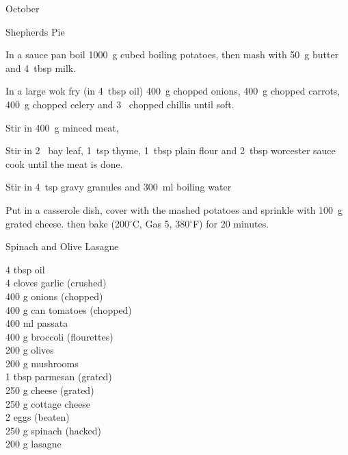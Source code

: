 \begin{menu}{October}
\begin{recipe}{2}{Shepherds Pie}
    \begin{instructions}
    \item 
        In a sauce pan boil
        1000~g cubed boiling potatoes,
        then mash with
        50~g  butter
        and
        4~tbsp  milk.
      \item 
        In a large wok fry
        (in 4~tbsp  oil)
        400~g chopped onions,
        400~g chopped carrots,
        400~g chopped celery
        and
        3~ chopped chillis
        until soft.
      \item 
        Stir in 
        400~g  minced meat,
      \item 
        Stir in
        2~  bay leaf,
        1~tsp  thyme,
        1~tbsp  plain flour
        and
        2~tbsp  worcester sauce
        cook until the meat is done.
      \item 
        Stir in
        4~tsp  gravy granules
        and
        300~ml  boiling water\item 
        Put in a casserole dish,
        cover with the mashed potatoes
        and sprinkle with
        100~g grated cheese.
        then bake (200$^{\circ}$C, Gas 5, 380$^{\circ}$F) for 20 minutes.
      
    \end{instructions}
    \end{recipe}%
  
    \begin{recipe}{2}{Spinach and Olive Lasagne}%
		\begin{ingredients}
		4 tbsp oil  \\
	4 cloves garlic (crushed) \\
	400 g onions (chopped) \\
	400 g can tomatoes (chopped) \\
	400 ml passata  \\
	400 g broccoli (flourettes) \\
	200 g olives  \\
	200 g mushrooms  \\
	1 tbsp parmesan (grated) \\
	250 g cheese (grated) \\
	250 g cottage cheese  \\
	2  eggs (beaten) \\
	250 g spinach (hacked) \\
	200 g lasagne  \\
	
		\end{ingredients}
	

\end{recipe}
\end{menu}

